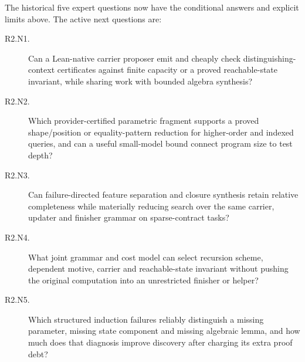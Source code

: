 The historical five expert questions now have the conditional answers and
explicit limits above. The active next questions are:
\begin{description}
\item[R2.N1.] Can a Lean-native carrier proposer emit and cheaply check
distinguishing-context certificates against finite capacity or a proved
reachable-state invariant, while sharing work with bounded algebra synthesis?
\item[R2.N2.] Which provider-certified parametric fragment supports a proved
shape/position or equality-pattern reduction for higher-order and indexed
queries, and can a useful small-model bound connect program size to test depth?
\item[R2.N3.] Can failure-directed feature separation and closure synthesis
retain relative completeness while materially reducing search over the same
carrier, updater and finisher grammar on sparse-contract tasks?
\item[R2.N4.] What joint grammar and cost model can select recursion scheme,
dependent motive, carrier and reachable-state invariant without pushing the
original computation into an unrestricted finisher or helper?
\item[R2.N5.] Which structured induction failures reliably distinguish a missing
parameter, missing state component and missing algebraic lemma, and how much
does that diagnosis improve discovery after charging its extra proof debt?
\end{description}
